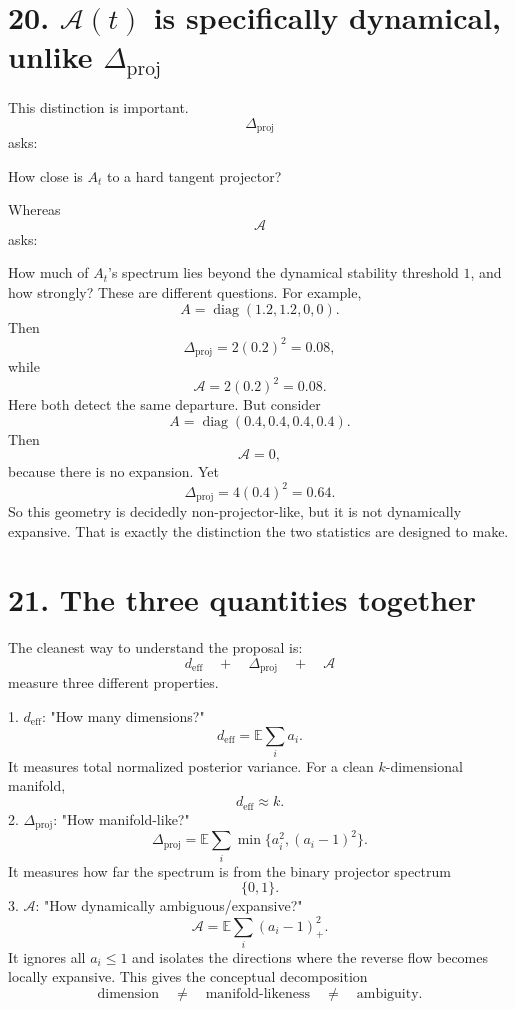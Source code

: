 \documentclass{article}
\begin{document}
\section*{20. $\mathcal A(t)$ is specifically dynamical, unlike $\Delta_{\mathrm{proj}}$}
This distinction is important.
\[
\Delta_{\mathrm{proj}}
\]
asks:

How close is $A_t$ to a hard tangent projector?

Whereas
\[
\mathcal A
\]
asks:

How much of $A_t$'s spectrum lies beyond the dynamical stability threshold $1$, and how strongly?
These are different questions.
For example,
\[
A = \operatorname{diag}(1.2,1.2,0,0).
\]
Then
\[
\Delta_{\mathrm{proj}} = 2(0.2)^2 = 0.08,
\]
while
\[
\mathcal A = 2(0.2)^2 = 0.08.
\]
Here both detect the same departure.
But consider
\[
A = \operatorname{diag}(0.4,0.4,0.4,0.4).
\]
Then
\[
\mathcal A = 0,
\]
because there is no expansion.
Yet
\[
\Delta_{\mathrm{proj}} = 4(0.4)^2 = 0.64.
\]
So this geometry is decidedly non-projector-like, but it is not dynamically expansive.
That is exactly the distinction the two statistics are designed to make.

\section*{21. The three quantities together}
The cleanest way to understand the proposal is:
\[
\boxed{
d_{\mathrm{eff}} \quad+\quad \Delta_{\mathrm{proj}} \quad+\quad \mathcal A
}
\]
measure three different properties.

1. $d_{\mathrm{eff}}$: "How many dimensions?"
\[
d_{\mathrm{eff}} = \mathbb E\sum_i a_i.
\]
It measures total normalized posterior variance.
For a clean $k$-dimensional manifold,
\[
d_{\mathrm{eff}}\approx k.
\]
2. $\Delta_{\mathrm{proj}}$: "How manifold-like?"
\[
\Delta_{\mathrm{proj}} = \mathbb E\sum_i \min\{a_i^2,(a_i-1)^2\}.
\]
It measures how far the spectrum is from the binary projector spectrum
\[
\{0,1\}.
\]
3. $\mathcal A$: "How dynamically ambiguous/expansive?"
\[
\mathcal A = \mathbb E\sum_i(a_i-1)_+^2.
\]
It ignores all $a_i\le1$ and isolates the directions where the reverse flow becomes locally expansive.
This gives the conceptual decomposition
\[
\boxed{
\text{dimension} \quad\neq\quad \text{manifold-likeness} \quad\neq\quad \text{ambiguity}.
}
\]
\end{document}
